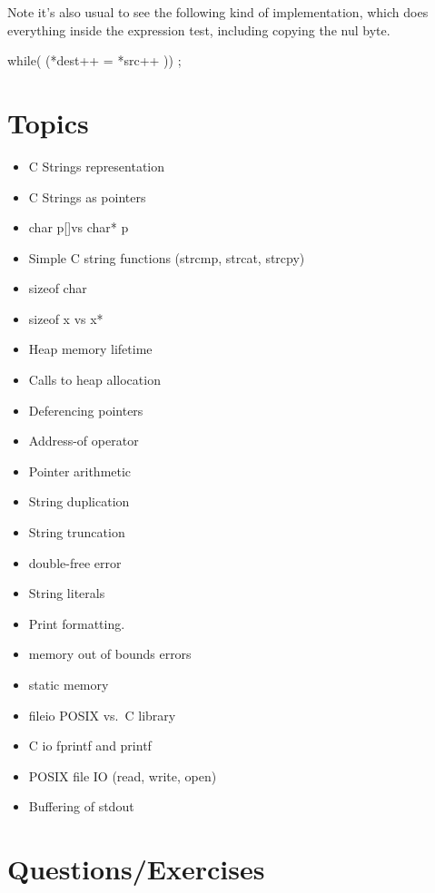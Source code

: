 Note it's also usual to see the following kind of implementation, which
does everything inside the expression test, including copying the nul
byte.

\begin{code}[language=C]
  while( (*dest++ = *src++ )) {};
\end{code}

\section{Topics}

\begin{itemize}
\tightlist
\item
  C Strings representation
\item
  C Strings as pointers
\item
  char p{[}{]}vs char* p
\item
  Simple C string functions (strcmp, strcat, strcpy)
\item
  sizeof char
\item
  sizeof x vs x*
\item
  Heap memory lifetime
\item
  Calls to heap allocation
\item
  Deferencing pointers
\item
  Address-of operator
\item
  Pointer arithmetic
\item
  String duplication
\item
  String truncation
\item
  double-free error
\item
  String literals
\item
  Print formatting.
\item
  memory out of bounds errors
\item
  static memory
\item
  fileio POSIX vs.~C library
\item
  C io fprintf and printf
\item
  POSIX file IO (read, write, open)
\item
  Buffering of stdout
\end{itemize}

\section{Questions/Exercises}


